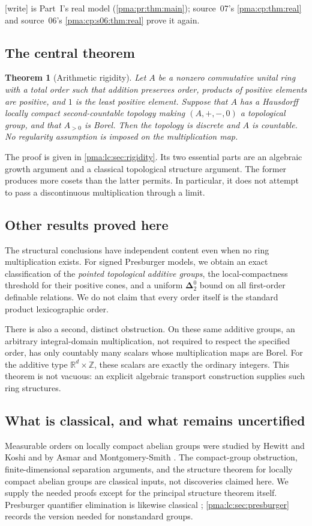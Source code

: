 \documentclass[11pt]{article}
\numberwithin{equation}{section}
\newtheorem{theorem}{Theorem}[section]
\theoremstyle{definition}
\theoremstyle{remark}
\newcommand{\Z}{\mathbb Z}
\newcommand{\R}{\mathbb R}
\newcommand{\Dtwo}{\boldsymbol{\Delta}^{0}_{2}}
\newcommand{\writetag}{\textup{\textsf{\small[write]}}}
\begin{document}
\noindent\writetag{}  is Part~I's real model
(\cref{pma:pr:thm:main}); source~07's \cref{pma:cp:thm:real} and source~06's
\cref{pma:cp:s06:thm:real} prove it again.

\subsection{The central theorem}
\begin{theorem}[Arithmetic rigidity]\label{pma:lc:thm:headline}
Let $A$ be a nonzero commutative unital ring with a total order such that
addition preserves order, products of positive elements are positive, and
$1$ is the least positive element. Suppose that $A$ has a Hausdorff locally
compact second-countable topology making $(A,+,-,0)$ a topological group,
and that $A_{>0}$ is Borel. Then the topology is discrete and $A$ is countable.
No regularity assumption is imposed on the multiplication map.
\end{theorem}

The proof is given in \cref{pma:lc:sec:rigidity}. Its two essential parts are an
algebraic growth argument and a classical topological structure argument.
The former produces more cosets than the latter permits. In particular,
it does not attempt to pass a discontinuous multiplication through a limit.

\subsection{Other results proved here}
The structural conclusions have independent content even when no ring
multiplication exists. For signed Presburger models, we obtain an exact
classification of the \emph{pointed topological additive groups}, the
local-compactness threshold for their positive cones, and a uniform
$\Dtwo$ bound on all first-order definable relations. We do not claim that
every order itself is the standard product lexicographic order.

There is also a second, distinct obstruction. On these same additive groups,
an arbitrary integral-domain multiplication, not required to respect the
specified order, has only countably many scalars whose multiplication maps
are Borel. For the additive type $\R^d\times\Z$, these scalars are exactly
the ordinary integers. This theorem is not vacuous: an explicit algebraic
transport construction supplies such ring structures.

\subsection{What is classical, and what remains uncertified}
Measurable orders on locally compact abelian groups were studied by Hewitt
and Koshi and by Asmar and Montgomery-Smith \cite{HewittKoshi,AsmarMS}.
The compact-group obstruction, finite-dimensional separation arguments,
and the structure theorem for locally compact abelian groups are classical
inputs, not discoveries claimed here. We supply the needed proofs except
for the principal structure theorem itself. Presburger quantifier elimination
is likewise classical \cite{Cluckers}; \cref{pma:lc:sec:presburger} records the
version needed for nonstandard groups.
\end{document}
